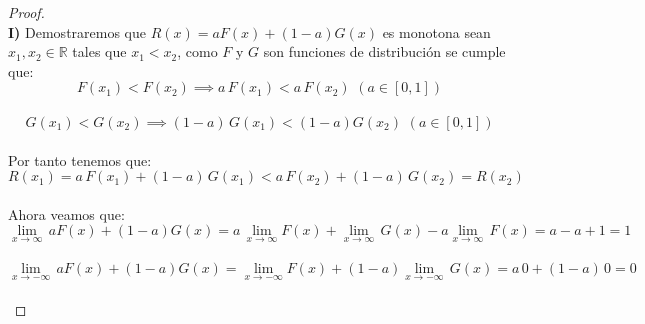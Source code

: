 \documentclass[11pt,letterpaper]{article}
\newcommand{\R}{\mathbb{R}}
\begin{document}
\begin{proof}\,\\
  \textbf{I)}\,\,Demostraremos que $R(x)=aF(x)+(1-a)G(x)$ es monotona sean $x_1,x_2\in \R$ tales que $x_1<x_2$, como $F$ y $G$ son funciones de 
  distribuci\'on se cumple que:\,\\
  \begin{equation*}
    F(x_1)<F(x_2)\implies a\,F(x_1)<a\,F(x_2)\,\,(a\in[0,1])
  \end{equation*}\,\\
  \begin{equation*}
    G(x_1)<G(x_2)\implies (1-a)\,G(x_1)<(1-a)G(x_2)\,\,(a\in [0,1])
  \end{equation*}\,\\
  Por tanto tenemos que:\,\\
  \begin{equation*}
    R(x_1)=a\,F(x_1)+(1-a)\,G(x_1)<a\,F(x_2)+(1-a)\,G(x_2)=R(x_2)
  \end{equation*}\,\\
  Ahora veamos que:\,\\
  \begin{equation*}
    \lim_{x\rightarrow \infty}\,aF(x)+(1-a)G(x)=a\,\lim_{x\rightarrow \infty}F(x)+\lim_{x\rightarrow \infty}\,G(x)-a\lim_{x\rightarrow \infty}\,F(x)=a-a+1=1
  \end{equation*}\,\\
  \begin{equation*}
    \lim_{x\rightarrow -\infty}\,aF(x)+(1-a)G(x)=\lim_{x\rightarrow -\infty}F(x)+(1-a)\lim_{x\rightarrow -\infty}\,G(x)=a\,0+(1-a)\,0=0
  \end{equation*}\,\\


\end{proof}
\end{document}
